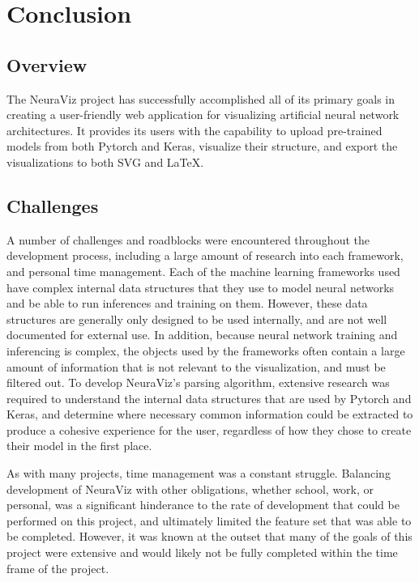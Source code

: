 \section{Conclusion}																	
\label{sec:Conclusion}

\subsection{Overview} 
The NeuraViz project has successfully accomplished all of its primary goals in creating a user-friendly web application for visualizing artificial neural network architectures. It provides its users with the capability to upload pre-trained models from both Pytorch and Keras, visualize their structure, and export the visualizations to both SVG and LaTeX.

\subsection{Challenges}
A number of challenges and roadblocks were encountered throughout the development process, including a large amount of research into each framework, and personal time management. Each of the machine learning frameworks used have complex internal data structures that they use to model neural networks and be able to run inferences and training on them. However, these data structures are generally only designed to be used internally, and are not well documented for external use. In addition, because neural network training and inferencing is complex, the objects used by the frameworks often contain a large amount of information that is not relevant to the visualization, and must be filtered out. To develop NeuraViz's parsing algorithm, extensive research was required to understand the internal data structures that are used by Pytorch and Keras, and determine where necessary common information could be extracted to produce a cohesive experience for the user, regardless of how they chose to create their model in the first place.

As with many projects, time management was a constant struggle. Balancing development of NeuraViz with other obligations, whether school, work, or personal, was a significant hinderance to the rate of development that could be performed on this project, and ultimately limited the feature set that was able to be completed. However, it was known at the outset that many of the goals of this project were extensive and would likely not be fully completed within the time frame of the project.

